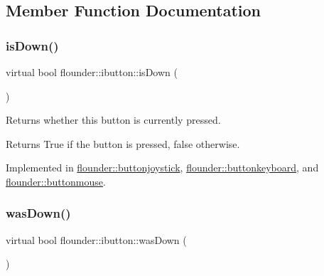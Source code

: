 \subsection{Member Function Documentation}
\mbox{\label{classflounder_1_1ibutton_ab64fd22a75ea66ce67fd9b1ad34fd837}} 
\subsubsection{\texorpdfstring{is\+Down()}{isDown()}}
{\footnotesize\ttfamily virtual bool flounder\+::ibutton\+::is\+Down (\begin{DoxyParamCaption}{ }\end{DoxyParamCaption})\hspace{0.3cm}{\ttfamily [pure virtual]}}



Returns whether this button is currently pressed. 

\begin{DoxyReturn}{Returns}
True if the button is pressed, false otherwise. 
\end{DoxyReturn}


Implemented in \hyperlink{classflounder_1_1buttonjoystick_ab6682d3554e007ef473c4595339f86f1}{flounder\+::buttonjoystick}, \hyperlink{classflounder_1_1buttonkeyboard_a432555049251cec48431e4f14b6aa34b}{flounder\+::buttonkeyboard}, and \hyperlink{classflounder_1_1buttonmouse_ab4d7ecd54f144f03886b5ef467666be1}{flounder\+::buttonmouse}.

\mbox{\label{classflounder_1_1ibutton_a5fb7b3493c0ea0e67bb9defc272da0d3}} 
\subsubsection{\texorpdfstring{was\+Down()}{wasDown()}}
{\footnotesize\ttfamily virtual bool flounder\+::ibutton\+::was\+Down (\begin{DoxyParamCaption}{ }\end{DoxyParamCaption})\hspace{0.3cm}{\ttfamily [pure virtual]}}



